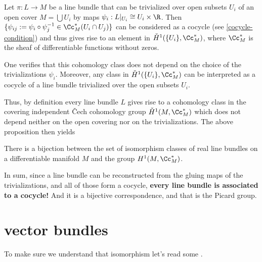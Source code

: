 Let $\pi:L\to M$ be a line bundle that can be trivialized over open subsets $U_i$ of an open cover $M=\bigcup U_i$ by maps $\psi_i:L|_{U_i}\cong U_i\times \R$. Then $\{\psi_{ij}:=\psi_i\circ\psi^{-1}_j\in\Cc_M^*(U_i\cap U_j)\}$ {\color{red}can be considered as a cocycle (see \cref{cocycle-condition})} and thus gives rise to an element in $\check{H}^1(\{U_i\},\Cc_M^*)$, where $\Cc^*_M$ is the sheaf of differentiable functions without zeros.

One verifies that this cohomology class does not depend on the choice of the trivializations $\psi_i$. Moreover, any class in $\check{H}^1(\{U_i\},\Cc_M^*)$ can be interpreted as a cocycle of a line bundle trivialized over the open subsets $U_i$.

Thus, by definition every line bundle $L$ gives rise to a cohomology class in the covering independent \v Cech cohomology group $\check{H}^1(M,\Cc^*_M)$ which does not depend neither on the open covering nor on the trivializations. The above proposition then yields

\begin{coro}
	There is a bijection between the set of isomorphism classes of real line bundles on a differentiable manifold $M$ and the group $H^1(M,\Cc^*_M)$.
\end{coro}

{\color{cyan} In sum, since a line bundle can be reconstructed from the gluing maps of the trivializations, and all of those form a cocycle, \textbf{every line bundle is associated to a cocycle!} And it is a bijective correspondence, and that is the Picard group.}

\section{vector bundles}
To make sure we understand that isomorphism let's read some \cite{hatcher-vb}.


